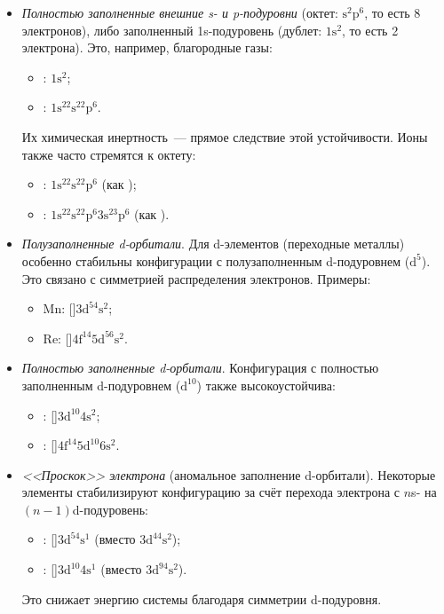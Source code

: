 \begin{itemize}
    \item \textit{Полностью заполненные внешние s- и p-подуровни} (октет: $\mathrm{s}^2\mathrm{p}^6$, то есть 8 электронов), либо заполненный 1s-подуровень (дублет: $1\mathrm{s}^2$, то есть 2 электрона). Это, например, благородные газы:
    \begin{itemize}
        \item {}: $1\mathrm{s}^2$;
        \item {}: $1\mathrm{s}^22\mathrm{s}^22\mathrm{p}^6$.
    \end{itemize}
    Их химическая инертность~--- прямое следствие этой устойчивости. Ионы также часто стремятся к октету:
    \begin{itemize}
        \item {}: $1\mathrm{s}^22\mathrm{s}^22\mathrm{p}^6$ (как );
        \item {}: $1\mathrm{s}^22\mathrm{s}^22\mathrm{p}^{6}3\mathrm{s}^23\mathrm{p}^6$ (как ).
    \end{itemize}
    \item \textit{Полузаполненные d-орбитали}. Для d-элементов (переходные металлы) особенно стабильны конфигурации с полузаполненным d-подуровнем ($\mathrm{d}^5$). Это связано с симметрией распределения электронов. Примеры:
    \begin{itemize}
        \item Mn: []$3\mathrm{d}^54\mathrm{s}^2$;
        \item Re: []$4\mathrm{f}^{14}5\mathrm{d}^56\mathrm{s}^2$.
    \end{itemize}
    \item \textit{Полностью заполненные d-орбитали}. Конфигурация с полностью заполненным d-подуровнем ($\mathrm{d}^{10}$) также высокоустойчива:
    \begin{itemize}
        \item {}: []$3\mathrm{d}^{10}4\mathrm{s}^2$;
        \item {}: []$4\mathrm{f}^{14}5\mathrm{d}^{10}6\mathrm{s}^2$.
    \end{itemize}
    \item \textit{<<Проскок>> электрона} (аномальное заполнение d-орбитали). Некоторые элементы стабилизируют конфигурацию за счёт перехода электрона с $n$s- на $(n - 1)$d-подуровень:
    \begin{itemize}
        \item {}: []$3\mathrm{d}^54\mathrm{s}^1$ (вместо $3\mathrm{d}^44\mathrm{s}^2$);
        \item {}: []$3\mathrm{d}^{10}4\mathrm{s}^1$ (вместо $3\mathrm{d}^94\mathrm{s}^2$).
    \end{itemize}
    Это снижает энергию системы благодаря симметрии d-подуровня.
\end{itemize}

